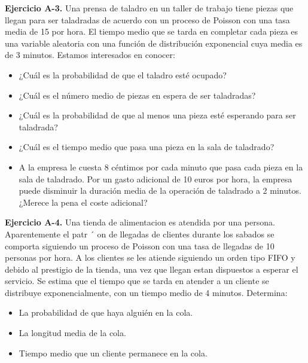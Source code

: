 \documentclass[
]{book}
\providecommand{\tightlist}{%
  \setlength{\itemsep}{0pt}\setlength{\parskip}{0pt}}
\theoremstyle{definition}
\theoremstyle{definition}
\theoremstyle{definition}
\theoremstyle{definition}
\theoremstyle{remark}
\begin{document}
\textbf{Ejercicio A-3.} Una prensa de taladro en un taller de trabajo tiene piezas que llegan para ser taladradas de acuerdo con un proceso de Poisson con una tasa media de 15 por hora. El tiempo medio que se tarda en completar cada pieza es una variable aleatoria con una función de distribución exponencial cuya media es de 3 minutos. Estamos interesados en conocer:

\begin{itemize}
\tightlist
\item
  ¿Cuál es la probabilidad de que el taladro esté ocupado?
\item
  ¿Cuál es el número medio de piezas en espera de ser taladradas?
\item
  ¿Cuál es la probabilidad de que al menos una pieza esté esperando para ser taladrada?
\item
  ¿Cuál es el tiempo medio que pasa una pieza en la sala de taladrado?
\item
  A la empresa le cuesta 8 céntimos por cada minuto que pasa cada pieza en la sala de taladrado. Por un gasto adicional de 10 euros por hora, la empresa puede disminuir la duración media de la operación de taladrado a 2 minutos. ¿Merece la pena el coste adicional?
\end{itemize}

\textbf{Ejercicio A-4.} Una tienda de alimentacion es atendida por una persona. Aparentemente el patr ´ on de llegadas de clientes durante los sabados se comporta siguiendo un proceso de Poisson con una tasa de llegadas de 10 personas por hora. A los clientes se les atiende siguiendo un orden tipo FIFO y debido al prestigio de la tienda, una vez que llegan estan dispuestos a esperar el servicio. Se estima que el tiempo que se tarda en atender a un cliente se distribuye exponencialmente, con un tiempo medio de 4 minutos.
Determina:

\begin{itemize}
\tightlist
\item
  La probabilidad de que haya alguién en la cola.
\item
  La longitud media de la cola.
\item
  Tiempo medio que un cliente permanece en la cola.
\end{itemize}
\end{document}
